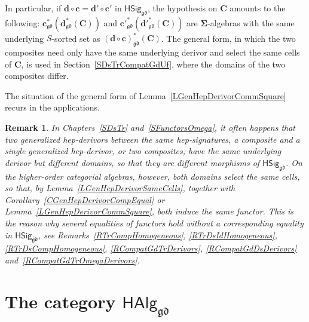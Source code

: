 \documentclass[a4paper, reqno]{amsbook}
\newcommand{\sig}[1]{\mathbf{#1}}             %
\newcommand{\gd}{\mathfrak{gd}}              %
\theoremstyle{plain}
\newtheorem{remark}[theorem]{Remark}
\theoremstyle{definition}
\begin{document}
In particular, if $\mathbf{d}\circ\mathbf{c}=\mathbf{d}'\circ\mathbf{c}'$ in $\mathsf{HSig}_{\gd}$, the hypothesis on $\mathbf{C}$ amounts to the following: $\mathbf{c}^{\ast}_{\gd}(\mathbf{d}^{\ast}_{\gd}(\mathbf{C}))$ and $\mathbf{c}'^{\ast}_{\gd}(\mathbf{d}'^{\ast}_{\gd}(\mathbf{C}))$ are $\sig{\Sigma}$-algebras with the same underlying $S$-sorted set as $(\mathbf{d}\circ\mathbf{c})^{\ast}_{\gd}(\mathbf{C})$.
The general form, in which the two composites need only have the same underlying derivor and select the same cells of $\mathbf{C}$, is used in Section~\ref{SDsTrCompatGdUf}, where the domains of the two composites differ.

The situation of the general form of Lemma~\ref{LGenHepDerivorCommSquare} recurs in the applications.

\begin{remark}\label{RSameCellsPattern}
In Chapters~\ref{SDsTr} and~\ref{SFunctorsOmega}, it often happens that two generalized hep-derivors between the same hep-signatures, a composite and a single generalized hep-derivor, or two composites, have the same underlying derivor but different domains, so that they are different morphisms of $\mathsf{HSig}_{\gd}$.
On the higher-order categorial algebras, however, both domains select the same cells, so that, by Lemma~\ref{LGenHepDerivorSameCells}, together with Corollary~\ref{CGenHepDerivorCompEqual} or Lemma~\ref{LGenHepDerivorCommSquare}, both induce the same functor.
This is the reason why several equalities of functors hold without a corresponding equality in $\mathsf{HSig}_{\gd}$, see Remarks~\ref{RTrCompHomogeneous}, \ref{RTrDsIdHomogeneous}, \ref{RTrDsCompHomogeneous}, \ref{RCompatGdTrDerivors}, \ref{RCompatGdDsDerivors} and~\ref{RCompatGdTrOmegaDerivors}.
\end{remark}

\section{The category \texorpdfstring{$\mathsf{HAlg}_{\gd}$}{HAlggd}}\label{SHepAlgCat}
\end{document}
